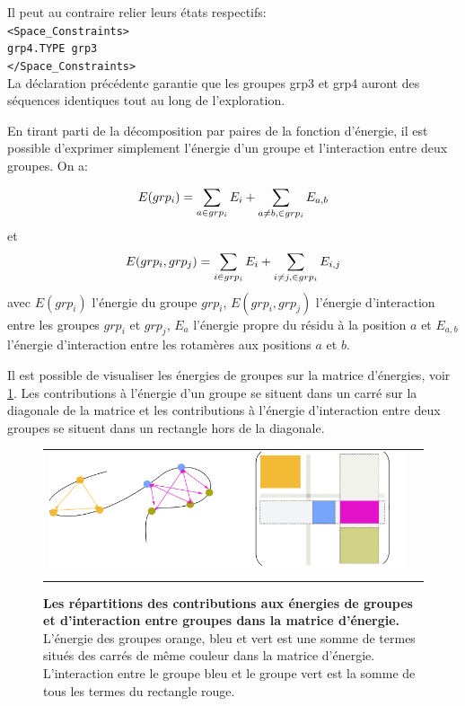 Il peut au contraire relier leurs états respectifs:\\
\verb!<Space_Constraints>! \\
\verb!grp4.TYPE grp3! \\
\verb!</Space_Constraints>! \\

La déclaration précédente garantie que les groupes grp3 et grp4 auront des séquences identiques tout au long de l'exploration. 

En tirant parti de la décomposition par paires de la fonction d'énergie, il est possible d'exprimer simplement l'énergie d'un groupe et l'interaction entre deux groupes. On a:

\begin{equation}
E(grp_i) = \sum_{a \in grp_i}E_i + \sum_{a \neq b, \in grp_i}E_{a,b} \\
\end{equation}
et
\begin{equation}
E(grp_i,grp_j) = \sum_{i \in grp_i}E_i + \sum_{i \neq j, \in grp_i}E_{i,j} \\
\end{equation}
avec $E(grp_i)$ l'énergie du groupe $grp_i$, $E(grp_i,grp_j)$ l'énergie d'interaction entre les groupes $grp_i$ et $grp_j$, $E_a$ l'énergie propre du résidu à la position $a$ et $E_{a,b}$ l'énergie d'interaction entre les rotamères aux positions $a$ et $b$.

Il est possible de visualiser les énergies de groupes sur la matrice d'énergies, voir \ref{fig:matrix_grp}. Les contributions à l'énergie d'un groupe se situent dans un carré sur la diagonale de la matrice et les contributions à l'énergie d'interaction entre deux groupes se situent dans un rectangle hors de la diagonale.


   \begin{figure}[!htbp]
     \centering
     \begin{tabular}{cc}
       \includegraphics[width=12cm]{figure/grp_matrix.png} &
     \end{tabular}
     
     \caption{\textbf{Les répartitions des contributions aux énergies de groupes et d'interaction entre groupes dans la matrice d'énergie.} L'énergie des groupes orange, bleu et vert est une somme de termes situés des carrés de même couleur dans la matrice d'énergie. L'interaction entre le groupe bleu et le groupe vert est la somme de tous les termes du rectangle rouge.}
\label{fig:matrix_grp}
   \end{figure}
   

